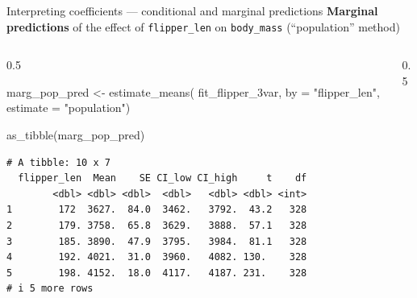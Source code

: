 \documentclass[
  10pt,
  ignorenonframetext,
  aspectratio=169,
  t]{beamer}
\newenvironment{Shaded}{\begin{snugshade}}{\end{snugshade}}
\newcommand{\AttributeTok}[1]{\textcolor[rgb]{0.40,0.45,0.13}{#1}}
\newcommand{\DecValTok}[1]{\textcolor[rgb]{0.68,0.00,0.00}{#1}}
\newcommand{\FunctionTok}[1]{\textcolor[rgb]{0.28,0.35,0.67}{#1}}
\newcommand{\NormalTok}[1]{\textcolor[rgb]{0.00,0.23,0.31}{#1}}
\newcommand{\OtherTok}[1]{\textcolor[rgb]{0.00,0.23,0.31}{#1}}
\newcommand{\SpecialCharTok}[1]{\textcolor[rgb]{0.37,0.37,0.37}{#1}}
\newcommand{\StringTok}[1]{\textcolor[rgb]{0.13,0.47,0.30}{#1}}
\newcommand{\bluebold}[1]{\textcolor{bluebeamer}{\textbf{#1}}}
\let\oldtexttt\texttt
\renewcommand{\texttt}[1]{\colorbox{gray!20}{\oldtexttt{#1}}}
\begin{document}
\begin{frame}[fragile]{Interpreting coefficients --- conditional and
marginal predictions}
\protect{}\label{interpreting-coefficients-conditional-and-marginal-predictions-7}
\bluebold{Marginal predictions} of the effect of \texttt{flipper\_len}
on \texttt{body\_mass} (``population'' method)

\begin{columns}[T]
\begin{column}{0.5\linewidth}
\scriptsize

\begin{Shaded}
\begin{Highlighting}[]
\NormalTok{marg\_pop\_pred }\OtherTok{\textless{}{-}} \FunctionTok{estimate\_means}\NormalTok{(}
\NormalTok{  fit\_flipper\_3var,}
  \AttributeTok{by =} \StringTok{"flipper\_len"}\NormalTok{,}
  \AttributeTok{estimate =} \StringTok{"population"}\NormalTok{)}

\FunctionTok{as\_tibble}\NormalTok{(marg\_pop\_pred)}
\end{Highlighting}
\end{Shaded}

\begin{verbatim}
# A tibble: 10 x 7
  flipper_len  Mean    SE CI_low CI_high     t    df
        <dbl> <dbl> <dbl>  <dbl>   <dbl> <dbl> <int>
1        172  3627.  84.0  3462.   3792.  43.2   328
2        179. 3758.  65.8  3629.   3888.  57.1   328
3        185. 3890.  47.9  3795.   3984.  81.1   328
4        192. 4021.  31.0  3960.   4082. 130.    328
5        198. 4152.  18.0  4117.   4187. 231.    328
# i 5 more rows
\end{verbatim}

\normalsize
\end{column}

\begin{column}{0.5\linewidth}
\scriptsize

\begin{Shaded}
\end{Shaded}
\end{column}
\end{columns}
\end{frame}
\end{document}
